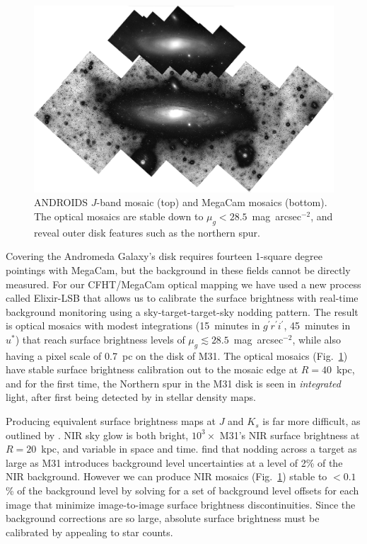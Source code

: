 \documentclass[11pt,twoside]{article}
\begin{document}
\begin{figure}[t]
\centering
\includegraphics[width=\columnwidth]{mosaics}
\caption{ANDROIDS $J$-band mosaic (top) and MegaCam mosaics (bottom). The optical mosaics are stable down to $\mu_g<28.5$~mag~arcsec$^{-2}$, and reveal outer disk features such as the northern spur.}
\label{fig:mosaics}
\end{figure}

Covering the Andromeda Galaxy's disk requires fourteen 1-square degree pointings with MegaCam, but the background in these fields cannot be directly measured.
For our CFHT/MegaCam optical mapping we have used a new process called Elixir-LSB that allows us to calibrate the surface brightness with real-time background monitoring  using a sky-target-target-sky nodding pattern.
The result is optical mosaics with modest integrations (15~minutes in $g^\prime r^\prime i^\prime$, 45~minutes in $u^*$) that reach surface brightness levels of $\mu_g \lesssim 28.5$~mag~arcsec$^{-2}$, while also having a pixel scale of 0.7~pc on the disk of M31.
The optical mosaics (Fig.~\ref{fig:mosaics}) have stable surface brightness calibration out to the mosaic edge at $R=40$~kpc, and for the first time, the Northern spur in the M31 disk is seen in \emph{integrated} light, after first being detected by \cite{Ferguson:2002} in stellar density maps.

Producing equivalent surface brightness maps at $J$ and $K_s$ is far more difficult, as outlined by \cite{Sick:2013}.
NIR sky glow is both bright, $10^3\times$ M31's NIR surface brightness at $R=20$~kpc, and variable in space and time.
\citeauthor{Sick:2013} find that nodding across a target as large as M31 introduces background level uncertainties at a level of 2\% of the NIR background.
However we can produce NIR mosaics (Fig.~\ref{fig:mosaics}) stable to $<0.1$\% of the background level by solving for a set of background level offsets for each image that minimize image-to-image surface brightness discontinuities.
Since the background corrections are so large, absolute surface brightness must be calibrated by appealing to star counts.
\end{document}

